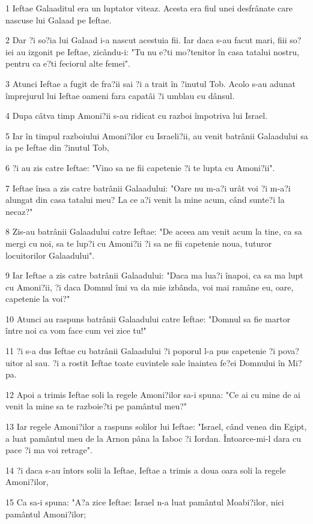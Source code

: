 \par 1 Ieftae Galaaditul era un luptator viteaz. Acesta era fiul unei desfrânate care nascuse lui Galaad pe Ieftae.
\par 2 Dar ?i so?ia lui Galaad i-a nascut acestuia fii. Iar daca s-au facut mari, fiii so?iei au izgonit pe Ieftae, zicându-i: "Tu nu e?ti mo?tenitor în casa tatalui nostru, pentru ca e?ti feciorul alte femei".
\par 3 Atunci Ieftae a fugit de fra?ii sai ?i a trait în ?inutul Tob. Acolo s-au adunat împrejurul lui Ieftae oameni fara capatâi ?i umblau cu dânsul.
\par 4 Dupa câtva timp Amoni?ii s-au ridicat cu razboi împotriva lui Israel.
\par 5 Iar în timpul razboiului Amoni?ilor cu Israeli?ii, au venit batrânii Galaadului sa ia pe Ieftae din ?inutul Tob,
\par 6 ?i au zis catre Ieftae: "Vino sa ne fii capetenie ?i te lupta cu Amoni?ii".
\par 7 Ieftae însa a zis catre batrânii Galaadului: "Oare nu m-a?i urât voi ?i m-a?i alungat din casa tatalui meu? La ce a?i venit la mine acum, când sunte?i la necaz?"
\par 8 Zis-au batrânii Galaadului catre Ieftae: "De aceea am venit acum la tine, ca sa mergi cu noi, sa te lup?i cu Amoni?ii ?i sa ne fii capetenie noua, tuturor locuitorilor Galaadului".
\par 9 Iar Ieftae a zis catre batrânii Galaadului: "Daca ma lua?i înapoi, ca sa ma lupt cu Amoni?ii, ?i daca Domnul îmi va da mie izbânda, voi mai ramâne eu, oare, capetenie la voi?"
\par 10 Atunci au raspuns batrânii Galaadului catre Ieftae: "Domnul sa fie martor între noi ca vom face cum vei zice tu!"
\par 11 ?i s-a dus Ieftae cu batrânii Galaadului ?i poporul l-a pus capetenie ?i pova?uitor al sau. ?i a rostit Ieftae toate cuvintele sale înaintea fe?ei Domnului în Mi?pa.
\par 12 Apoi a trimis Ieftae soli la regele Amoni?ilor sa-i spuna: "Ce ai cu mine de ai venit la mine sa te razboie?ti pe pamântul meu?"
\par 13 Iar regele Amoni?ilor a raspuns solilor lui Ieftae: "Israel, când venea din Egipt, a luat pamântul meu de la Arnon pâna la Iaboc ?i Iordan. Întoarce-mi-l dara cu pace ?i ma voi retrage".
\par 14 ?i daca s-au întors solii la Ieftae, Ieftae a trimis a doua oara soli la regele Amoni?ilor,
\par 15 Ca sa-i spuna: "A?a zice Ieftae: Israel n-a luat pamântul Moabi?ilor, nici pamântul Amoni?ilor;
